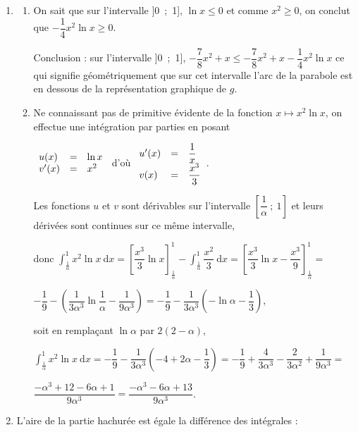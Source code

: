 \begin{enumerate}
\item 
	\begin{enumerate}
		\item On sait que sur l'intervalle ]0~;~1], $\ln x \leqslant  0$ et comme $x^2 \geqslant 0$, on conclut que $- \dfrac14 x^2 \ln x \geqslant 0$.

Conclusion : sur l'intervalle ]0~;~1], $- \dfrac78 x^2 + x \leqslant - \dfrac78 x^2 + x - \dfrac14 x^2 \ln x$ ce qui signifie géométriquement que sur cet intervalle l'arc de la parabole est en dessous de la représentation graphique de $g$.
		\item Ne connaissant pas de primitive évidente de la fonction $x \longmapsto x^2 \ln x$, on effectue une intégration par parties en posant 
		
$\begin{array}{l c l}
u(x)&=&\ln x\\
v'(x)&=&x^2
\end{array}$ d'où $\begin{array}{l c l}
u'(x)&=&\dfrac 1x\\
v(x)&=&\dfrac{x^3}{3}
\end{array}$.

Les fonctions $u$ et $v$ sont dérivables sur l'intervalle $\left[\dfrac{1}{\alpha}~;~1\right]$ et leurs dérivées sont continues sur ce même intervalle,

donc $\displaystyle\int_{\frac{1}{\alpha}}^1 x^2 \ln x\:\text{d}x = \left[\dfrac{x^3}{3}\ln x \right]_{\frac{1}{\alpha}}^1 - \displaystyle\int_{\frac{1}{\alpha}}^1 \dfrac{x^2}{3}\:\text{d}x = \left[\dfrac{x^3}{3}\ln x - \dfrac{x^3}{9}\right]_{\frac{1}{\alpha}}^1 =$

$- \dfrac19 - \left(\dfrac{1}{3\alpha^3}\ln \dfrac{1}{\alpha} - \dfrac{1}{9\alpha^3} \right) = - \dfrac19 - \dfrac{1}{3\alpha^3}\left(- \ln \alpha - \dfrac13 \right)$, 

soit en remplaçant $\ln \alpha$ par $2(2 - \alpha)$,

$\displaystyle\int_{\frac{1}{\alpha}}^1 x^2 \ln x\:\text{d}x = - \dfrac19 - \dfrac{1}{3\alpha^3}\left(- 4 + 2\alpha - \dfrac13\right) = - \dfrac19 + \dfrac{4}{3\alpha^3} - \dfrac{2}{3\alpha^2} + \dfrac{1}{9\alpha^3} =$

$ \dfrac{- \alpha^3 + 12 - 6\alpha + 1}{9\alpha^3} = \dfrac{- \alpha^3 - 6\alpha + 13}{9\alpha^3}$.
	\end{enumerate}
\item L'aire de la partie hachurée est égale la différence des intégrales :


\end{enumerate}
